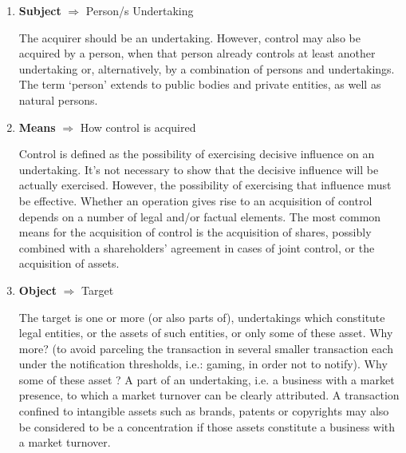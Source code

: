         \begin{enumerate}
            \item \textbf{Subject} \(\Rightarrow\) Person/s Undertaking

                The acquirer should be an undertaking. However, control may also be acquired by a person, when that person already controls at least another undertaking or, alternatively, by a combination of persons and undertakings. The term ‘person’ extends to public bodies and private entities, as well as natural persons. 

            \item \textbf{Means} \(\Rightarrow\) How control is acquired

                Control is defined as the possibility of exercising decisive influence on an undertaking. It’s not necessary to show that the decisive influence will be actually exercised. However, the possibility of exercising that influence must be effective. Whether an operation gives rise to an acquisition of control depends on a number of legal and/or factual elements. The most common means for the acquisition of control is the acquisition of shares, possibly combined with a shareholders' agreement in cases of joint control, or the acquisition of assets.

            \item \textbf{Object} \(\Rightarrow\) Target

                The target is one or more (or also parts of), undertakings which constitute legal entities, or the assets of such entities, or only some of these asset. Why more? (to avoid parceling the transaction in several smaller transaction each under the notification thresholds, i.e.: gaming, in order not to notify). Why some of these asset ? A part of an undertaking, i.e. a business with a market presence, to which a market turnover can be clearly attributed. A transaction confined to intangible assets such as brands, patents or copyrights may also be considered to be a concentration if those assets constitute a business with a market turnover.
        \end{enumerate}

